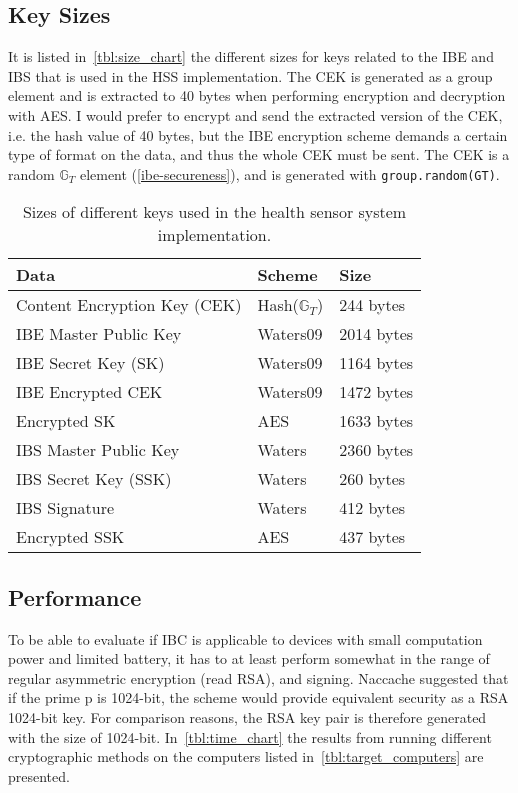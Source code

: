 \subsection{Key Sizes}
It is listed in~\autoref{tbl:size_chart} the different sizes for keys related to the \gls{IBE} and \gls{IBS} that is used in the \gls{HSS} implementation.
The \gls{CEK} is generated as a group element and is extracted to 40 bytes when performing encryption and decryption with \gls{AES}.
I would prefer to encrypt and send the extracted version of the \gls{CEK}, i.e. the hash value of 40 bytes, but the \gls{IBE} encryption scheme demands a certain type of format on the \gls{data}, and thus the whole \gls{CEK} must be sent.
The \gls{CEK} is a random $\mathbb{G}_T$ element (\autoref{ibe-secureness}), and is generated with \texttt{group.random(GT)}.
\begin{table}[h]
  \begin{tabular}[c]{p{}p{}p{}}
  Data                            & Scheme          & Size              \\ \hline
  Content Encryption Key (CEK)    & Hash($\mathbb{G}_T$) & 244 bytes         \\ %
  IBE Master Public Key           & Waters09        & 2014 bytes        \\ %
  IBE Secret Key (SK)             & Waters09        & 1164 bytes        \\ %
  IBE Encrypted CEK               & Waters09        & 1472 bytes        \\ %
  Encrypted SK                    & AES             & 1633 bytes        \\ %
  IBS Master Public Key           & Waters          & 2360 bytes        \\ %
  IBS Secret Key (SSK)            & Waters          & 260 bytes         \\ %
  IBS Signature                   & Waters          & 412 bytes         \\ %
  Encrypted SSK                   & AES             & 437 bytes         \\ %
  \end{tabular}
  \caption[Size chart of IBC parameters]{Sizes of different keys used in the health sensor system implementation.}
  \label{tbl:size_chart}
\end{table}


\subsection{Performance}\label{ibc-performance}
To be able to evaluate if \gls{IBC} is applicable to devices with small computation power and limited battery, it has to at least perform somewhat in the range of regular asymmetric encryption (read RSA), and signing. 
Naccache suggested that if the prime \gls{p} is 1024-bit, the scheme would provide equivalent security as a RSA 1024-bit key.
For comparison reasons, the RSA key pair is therefore generated with the size of 1024-bit.
In~\autoref{tbl:time_chart} the results from running different cryptographic methods on the computers listed in~\autoref{tbl:target_computers} are presented.

